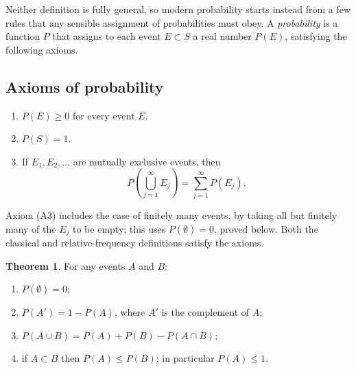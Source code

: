\documentclass[12pt,a4paper]{report}
\theoremstyle{definition}
\newtheorem{thm}{Theorem}[section]
\theoremstyle{plain}
\theoremstyle{definition}
\begin{document}
Neither definition is fully general, so modern probability starts instead from a few
rules that any sensible assignment of probabilities must obey. A \emph{probability} is
a function $P$ that assigns to each event $E\subset S$ a real number $P(E)$, satisfying
the following axioms.

\subsection{Axioms of probability}

\begin{enumerate}
\item[(A1)] $P(E)\ge 0$ for every event $E$.
\item[(A2)] $P(S) = 1$.
\item[(A3)] If $E_1, E_2, \dots$ are mutually exclusive events, then
\[P\left(\bigcup_{j=1}^\infty E_j\right) = \sum_{j=1}^\infty P(E_j).\]
\end{enumerate}

Axiom (A3) includes the case of finitely many events, by taking all but finitely many
of the $E_j$ to be empty; this uses $P(\emptyset) = 0$, proved below. Both the classical
and relative-frequency definitions satisfy the axioms.

\begin{thm}
\label{thm:probrules}
For any events $A$ and $B$:
\begin{enumerate}
\item[(i)] $P(\emptyset) = 0$;
\item[(ii)] $P(A') = 1 - P(A)$, where $A'$ is the complement of $A$;
\item[(iii)] $P(A\cup B) = P(A) + P(B) - P(A\cap B)$;
\item[(iv)] if $A\subset B$ then $P(A)\le P(B)$; in particular $P(A)\le 1$.
\end{enumerate}
\end{thm}
\end{document}
